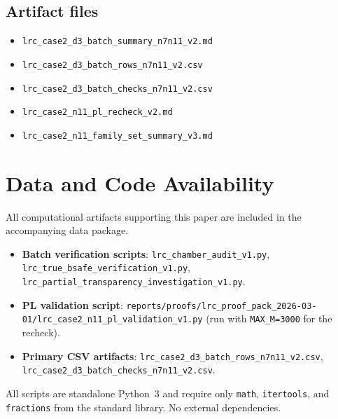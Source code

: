 \documentclass[11pt]{article}
\theoremstyle{definition}
\begin{document}
\subsection*{Artifact files}
\begin{itemize}
  \item \texttt{lrc\_case2\_d3\_batch\_summary\_n7n11\_v2.md}
  \item \texttt{lrc\_case2\_d3\_batch\_rows\_n7n11\_v2.csv}
  \item \texttt{lrc\_case2\_d3\_batch\_checks\_n7n11\_v2.csv}
  \item \texttt{lrc\_case2\_n11\_pl\_recheck\_v2.md}
  \item \texttt{lrc\_case2\_n11\_family\_set\_summary\_v3.md}
\end{itemize}

\section*{Data and Code Availability}

All computational artifacts supporting this paper are included in the
accompanying data package.
\begin{itemize}
  \item \textbf{Batch verification scripts}: \texttt{lrc\_chamber\_audit\_v1.py},
    \texttt{lrc\_true\_bsafe\_verification\_v1.py},
    \texttt{lrc\_partial\_transparency\_investigation\_v1.py}.
  \item \textbf{PL validation script}:
    \texttt{reports/proofs/lrc\_proof\_pack\_2026-03-01/lrc\_case2\_n11\_pl\_validation\_v1.py}
    (run with \texttt{MAX\_M=3000} for the recheck).
  \item \textbf{Primary CSV artifacts}:
    \texttt{lrc\_case2\_d3\_batch\_rows\_n7n11\_v2.csv},
    \texttt{lrc\_case2\_d3\_batch\_checks\_n7n11\_v2.csv}.
\end{itemize}

All scripts are standalone Python~3 and require only \texttt{math},
\texttt{itertools}, and \texttt{fractions} from the standard library.
No external dependencies.
\end{document}
